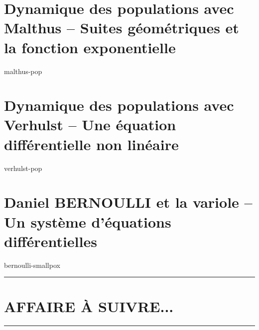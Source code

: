 \documentclass[12pt]{amsart}
\let\oldsection\section
\renewcommand\section[1]{\vfill\pagebreak\oldsection{#1}}
\begin{document}


\section{Dynamique des populations avec Malthus -- Suites géométriques et la fonction exponentielle}

{malthus-pop}




\section{Dynamique des populations avec Verhulst -- Une équation différentielle non linéaire}
\label{verhulst-model}

{verhulst-pop}




\section{Daniel BERNOULLI et la variole -- Un système d'équations différentielles}
\label{bernoulli-model}

{bernoulli-smallpox}








%



\bigskip

\hrule

\oldsection{AFFAIRE À SUIVRE...}

\bigskip

\hrule
\end{document}
